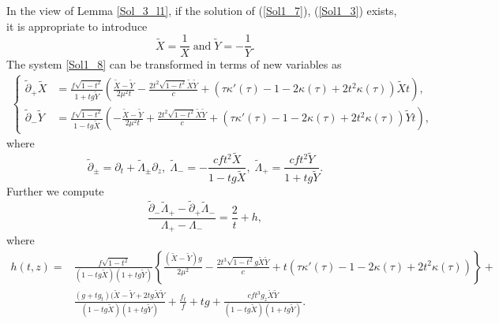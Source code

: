 \documentclass[3p,11pt]{elsarticle}
\numberwithin{equation}{section}
\begin{document}
In the view of Lemma \ref{Sol_3_l1}, if the solution of (\ref{Sol1_7}), (\ref{Sol1_3}) exists, it is appropriate to introduce
\begin{equation}\label{Sol3_1}
    \widetilde X = \frac{1}{ X}\; \text{and} \; \widetilde Y = -\frac{1}{ Y}.
\end{equation}
The system \eqref{Sol1_8} can be transformed in terms of new variables as
\begin{equation}\label{Sol3_2}
    \begin{split}
        \begin{cases}
            \tilde\partial_+\widetilde X&=\frac{f\sqrt{1-t^2}}{1+tg\widetilde Y}\left( \frac{\widetilde X-\widetilde Y}{2\mu^2 t}-\frac{2t^2\sqrt{1-t^2}\widetilde X\widetilde Y}{c}+\left(\tau\kappa'(\tau)-1-2\kappa(\tau)+2t^2\kappa(\tau)\right)\widetilde X t \right),\\
            \tilde\partial_-\widetilde Y&=\frac{f\sqrt{1-t^2}}{1-tg\widetilde X}\left( -\frac{\widetilde X-\widetilde Y}{2\mu^2 t}+\frac{2t^2\sqrt{1-t^2}\widetilde X\widetilde Y}{c}+\left(\tau\kappa'(\tau)-1-2\kappa(\tau)+2t^2\kappa(\tau)\right)\widetilde Y t \right), 
        \end{cases}
    \end{split}
\end{equation}
where
\begin{equation}\label{Sol3_3}
   \tilde\partial_\pm  =\partial_t+\tilde\Lambda_\pm \partial_z, \; \tilde\Lambda_-=-\frac{cft^2\widetilde X}{1-tg\widetilde X}, \; \tilde\Lambda_+=\frac{cft^2\widetilde Y}{1+tg\widetilde Y}.
\end{equation}
Further we compute
\begin{equation}\label{Sol3_4}
    \frac{\tilde\partial_-\tilde\Lambda_+-\tilde\partial_+\tilde\Lambda_-}{\Lambda_+-\Lambda_-}=\frac{2}{t}+h,
\end{equation}
where 
\begin{equation*}
   \begin{split}
        h(t,z)=&\frac{f\sqrt{1-t^2}}{(1-tg\widetilde X)(1+tg\widetilde Y)} \left\{ \frac{(\widetilde X-\widetilde Y)g}{2\mu^2}-\frac{2t^3\sqrt{1-t^2}g\widetilde X\widetilde Y}{c}+t(\tau\kappa'(\tau)-1-2\kappa(\tau)+2t^2\kappa(\tau))\right\}+ \\ &\frac{(g+tg_t)(\widetilde X-\widetilde Y+2tg\widetilde X\widetilde Y}{(1-tg\widetilde X)(1+tg\widetilde Y)}+\frac{f_t}{f}+tg+\frac{cft^3g_z\widetilde X\widetilde Y}{(1-tg\widetilde X)(1+tg\widetilde Y)}.
   \end{split}
\end{equation*}
\end{document}
